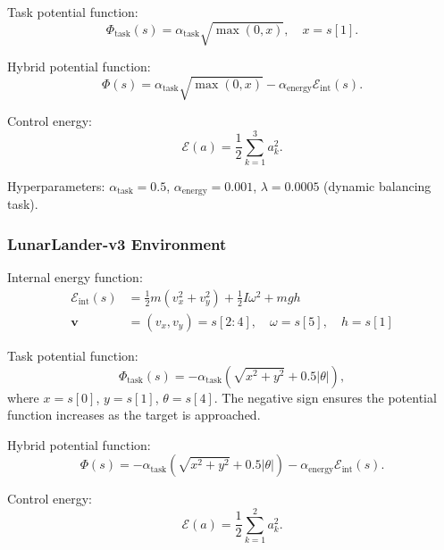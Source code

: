 \documentclass[journal]{IEEEtran}
\begin{document}
	Task potential function:
	\begin{equation}
		\Phi_{\text{task}}(s) = \alpha_{\text{task}}\sqrt{\max(0, x)}, \quad x = s[1].
	\end{equation}
	
	Hybrid potential function:
	\begin{equation}
		\Phi(s) = \alpha_{\text{task}}\sqrt{\max(0, x)} - \alpha_{\text{energy}}\mathcal{E}_{\text{int}}(s).
	\end{equation}
	
	Control energy:
	\begin{equation}
		\mathcal{E}(a) = \frac{1}{2}\sum_{k=1}^{3}a_k^2.
	\end{equation}
	
	Hyperparameters: $\alpha_{\text{task}}=0.5$, $\alpha_{\text{energy}}=0.001$, $\lambda=0.0005$ (dynamic balancing task).
	
	\subsubsection{LunarLander-v3 Environment}
	
	Internal energy function:
	\begin{equation}
		\begin{aligned}
			\mathcal{E}_{\text{int}}(s) &= \frac{1}{2}m(v_x^2 + v_y^2) + \frac{1}{2}I\omega^2 + mgh \\
			\mathbf{v} &= (v_x, v_y) = s[2:4], \quad \omega = s[5], \quad h = s[1]
		\end{aligned}
	\end{equation}
	
	Task potential function:
	\begin{equation}
		\Phi_{\text{task}}(s) = -\alpha_{\text{task}}\left(\sqrt{x^2+y^2} + 0.5|\theta|\right),
	\end{equation}
	where $x=s[0]$, $y=s[1]$, $\theta=s[4]$. The negative sign ensures the potential function increases as the target is approached.
	
	Hybrid potential function:
	\begin{equation}
		\Phi(s) = -\alpha_{\text{task}}\left(\sqrt{x^2+y^2} + 0.5|\theta|\right) - \alpha_{\text{energy}}\mathcal{E}_{\text{int}}(s).
	\end{equation}
	
	Control energy:
	\begin{equation}
		\mathcal{E}(a) = \frac{1}{2}\sum_{k=1}^{2}a_k^2.
	\end{equation}
	
\end{document}
